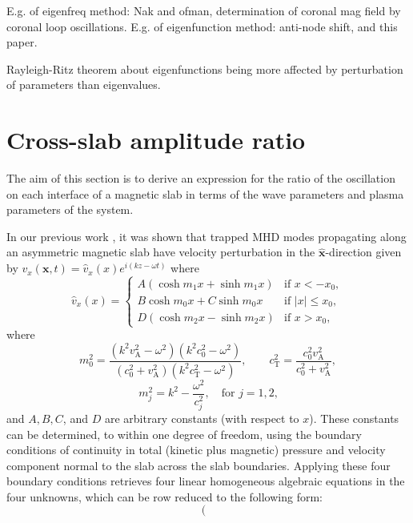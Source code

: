 \documentclass[namedreferences]{solarphysics}
\numberwithin{equation}{section}
\begin{document}
\begin{article}
E.g. of eigenfreq method: Nak and ofman, determination of coronal mag field by coronal loop oscillations. E.g. of eigenfunction method: anti-node shift, and this paper.

Rayleigh-Ritz theorem about eigenfunctions being more affected by perturbation of parameters than eigenvalues. 

\section{Cross-slab amplitude ratio} \label{sec: CSAR}
The aim of this section is to derive an expression for the ratio of the oscillation on each interface of a magnetic slab in terms of the wave parameters and plasma parameters of the system.

In our previous work \citep{all_etal17}, it was shown that trapped MHD modes propagating along an asymmetric magnetic slab have velocity perturbation in the $\mathbf{\widehat{x}}$-direction given by $v_x(\mathbf{x}, t) = \widehat{v}_x(x)e^{i(kz-\omega t)}$ where
\begin{equation}
\widehat{v}_x(x)=
\begin{cases}
A(\cosh{m_1x}+\sinh{m_1x}) & \text{if }x<-x_0, \\
B\cosh{m_0x}+C\sinh{m_0x} & \text{if }|x|\leq{x_0}, \\
D(\cosh{m_2x}-\sinh{m_2x}) & \text{if  }x>x_0, \label{vsoln}
\end{cases}
\end{equation}
where
\begin{equation}
m_0^2=\frac{(k^2v_\textrm{A}^2-\omega^2)(k^2c_0^2-\omega^2)}{(c_0^2+v_\textrm{A}^2)(k^2c_\textrm{T}^2-\omega^2)}, \qquad c_\textrm{T}^2=\frac{c_0^2v_\textrm{A}^2}{c_0^2+v_\textrm{A}^2}, \label{m0}
\end{equation}
\begin{equation}
m_j^2=k^2-\frac{\omega^2}{c_j^2}, \quad \text{for $j=1,2$,} \label{m1/2}
\end{equation}
and $A, B, C$, and $D$ are arbitrary constants (with respect to $x$). These constants can be determined, to within one degree of freedom, using the boundary conditions of continuity in total (kinetic plus magnetic) pressure and velocity component normal to the slab across the slab boundaries. Applying these four boundary conditions retrieves four linear homogeneous algebraic equations in the four unknowns, which can be row reduced to the following form:
\begin{equation}
\left(
\begin{matrix}

\end{matrix}
\end{equation}
\end{article}
\end{document}
